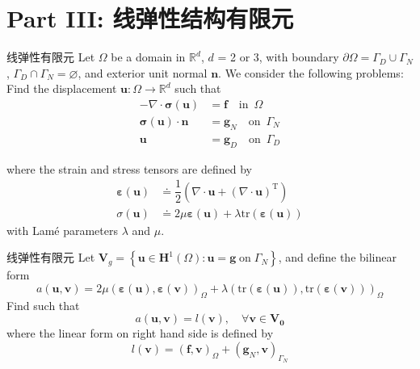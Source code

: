 \documentclass[lang=en,aspectratio=43,theme=default,logo=on]{simplebeamer}
\begin{document}
\section{Part III: 线弹性结构有限元}

\begin{frame}{线弹性有限元}
    Let $\Omega$ be a domain in $\mathbb{R}^d$, $d$ = 2 or 3, with boundary $\partial \Omega = \Gamma_D \cup \Gamma_N$, $\Gamma_D \cap \Gamma_N = \varnothing$, and exterior unit normal $\mathbf{n}$. We consider the following problems: \\
    Find the displacement $\mathbf{u} : \Omega \to \mathbb{R}^d$ such that
    \begin{align*}
        -\nabla \cdot \boldsymbol{\sigma} (\mathbf{u}) &= \mathbf{f} \quad \mathrm{in} \enspace \Omega \\
        \boldsymbol{\sigma} (\mathbf{u}) \cdot \mathbf{n} &= \mathbf{g}_N \quad \mathrm{on} \enspace \Gamma_N \\
        \mathbf{u} &= \mathbf{g}_D \quad \mathrm{on} \enspace \Gamma_D
    \end{align*}

    where the strain and stress tensors are defined by
    \begin{align*}
        \boldsymbol{\varepsilon} (\mathbf{u}) &\doteq \dfrac{1}{2} \left( \nabla \cdot \mathbf{u} + (\nabla \cdot \mathbf{u} )^{\mathrm{T}} \right) \\
        \sigma (\mathbf{u}) &\doteq 2\mu \boldsymbol{\varepsilon} (\mathbf{u}) + \lambda \mathrm{tr}(\boldsymbol{\varepsilon} (\mathbf{u}))
    \end{align*}
    with Lamé parameters $\lambda$ and $\mu$.

\end{frame}

\begin{frame}{线弹性有限元}
    Let $\mathbf{V}_g = \left\{ \mathbf{u} \in \mathbf{H}^1(\Omega) : \mathbf{u} = \mathbf{g} \; \mathrm{on} \; \Gamma_N\right\}$, and define the bilinear form
    \begin{equation*}
        a(\mathbf{u},\mathbf{v})=2\mu \left( \boldsymbol{\varepsilon}(\mathbf{u}), \boldsymbol{\varepsilon}(\mathbf{v})\right)_\Omega + \lambda \left( \mathrm{tr}(\boldsymbol{\varepsilon}(\mathbf{u})), \mathrm{tr}(\boldsymbol{\varepsilon}(\mathbf{v}))\right)_\Omega
    \end{equation*}
    Find such that
    \begin{equation*}
        a(\mathbf{u}, \mathbf{v})=l(\mathbf{v}), \quad \forall \mathbf{v} \in \mathbf{V_0}
    \end{equation*}
    where the linear form on right hand side is defined by
    \begin{equation*}
        l(\mathbf{v})=\left( \mathbf{f} , \mathbf{v}\right)_\Omega + \left( \mathbf{g}_N , \mathbf{v}\right)_{\Gamma_N}
    \end{equation*}
\end{frame}
\end{document}
